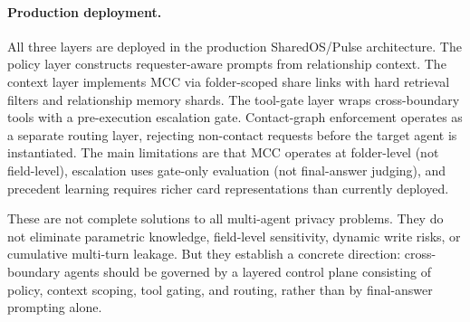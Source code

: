 \paragraph{Production deployment.} All three layers are deployed in the production SharedOS/Pulse architecture. The policy layer constructs requester-aware prompts from relationship context. The context layer implements MCC via folder-scoped share links with hard retrieval filters and relationship memory shards. The tool-gate layer wraps cross-boundary tools with a pre-execution escalation gate. Contact-graph enforcement operates as a separate routing layer, rejecting non-contact requests before the target agent is instantiated. The main limitations are that MCC operates at folder-level (not field-level), escalation uses gate-only evaluation (not final-answer judging), and precedent learning requires richer card representations than currently deployed.

These are not complete solutions to all multi-agent privacy problems. They do not eliminate parametric knowledge, field-level sensitivity, dynamic write risks, or cumulative multi-turn leakage. But they establish a concrete direction: cross-boundary agents should be governed by a layered control plane consisting of policy, context scoping, tool gating, and routing, rather than by final-answer prompting alone.
